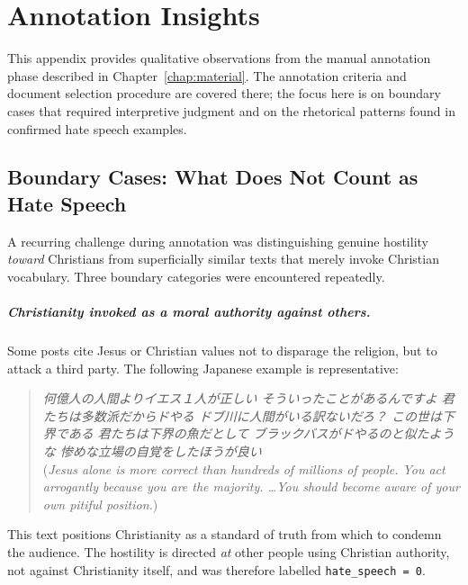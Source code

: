 \documentclass[../CLthesis.tex]{subfiles}
\begin{document}
\chapter{Annotation Insights}%
\label{appendix:annotation}

This appendix provides qualitative observations from the manual annotation phase described in Chapter~\ref{chap:material}. The annotation criteria and document selection procedure are covered there; the focus here is on boundary cases that required interpretive judgment and on the rhetorical patterns found in confirmed hate speech examples.

\section{Boundary Cases: What Does Not Count as Hate Speech}
\label{sec:annotation-boundary}

A recurring challenge during annotation was distinguishing genuine hostility \emph{toward} Christians from superficially similar texts that merely invoke Christian vocabulary. Three boundary categories were encountered repeatedly.

\paragraph{Christianity invoked as a moral authority against others.}
Some posts cite Jesus or Christian values not to disparage the religion, but to attack a third party. The following Japanese example is representative:

\begin{quote}
\textit{何億人の人間よりイエス１人が正しい そういったことがあるんですよ 君たちは多数派だからドやる ドブ川に人間がいる訳ないだろ？ この世は下界である 君たちは下界の魚だとして ブラックバスがドやるのと似たような 惨めな立場の自覚をしたほうが良い} \\
(\textit{Jesus alone is more correct than hundreds of millions of people. You act arrogantly because you are the majority. \ldots You should become aware of your own pitiful position.})
\end{quote}

This text positions Christianity as a standard of truth from which to condemn the audience. The hostility is directed \emph{at} other people using Christian authority, not against Christianity itself, and was therefore labelled \texttt{hate\_speech = 0}.
\end{document}
